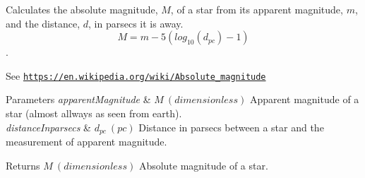 Calculates the absolute magnitude, $M$, of a star from its apparent magnitude, $m$, and the distance, $d$, in parsecs it is away. \[M= m - 5 \left ( log_{10}(d_{pc}) - 1 \right )\]. 

See \href{https://en.wikipedia.org/wiki/Absolute_magnitude}{\tt https\+://en.\+wikipedia.\+org/wiki/\+Absolute\+\_\+magnitude}


\begin{DoxyParams}{Parameters}
{\em apparent\+Magnitude} & $M\ (dimensionless)$ Apparent magnitude of a star (almost allways as seen from earth). \\
\hline
{\em distance\+Inparsecs} & $d_{pc}\ (pc)$ Distance in parsecs between a star and the measurement of apparent magnitude. \\
\hline
\end{DoxyParams}
\begin{DoxyReturn}{Returns}
$M\ (dimensionless)$ Absolute magnitude of a star. 
\end{DoxyReturn}
